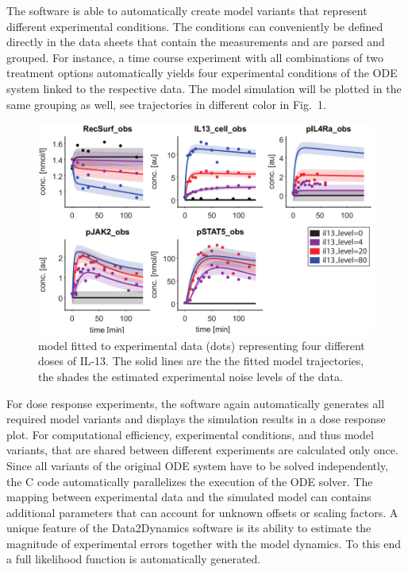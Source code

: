 \documentclass{bioinfo}
\begin{document}
The software is able to automatically create model variants that 
represent different experimental conditions. The conditions can conveniently be defined directly in 
the data sheets that contain the measurements and are parsed and 
grouped. For instance, a time course experiment with all combinations of two treatment 
options automatically yields four experimental conditions of the ODE system linked to the 
respective data. The model simulation will be plotted in the same grouping as well, see 
trajectories in different color in Fig.~1. 
\begin{figure}[!tpb]
\centerline{\includegraphics[width=\linewidth]{Figure_D2D_AppNote_v2a.pdf}}
\caption{\citet{Raia:2011vn} model fitted to experimental data (dots) representing four 
different doses of IL-13. The solid lines are the the fitted model trajectories, the shades 
the estimated experimental noise levels of the data.}\label{fig:01}
\end{figure}
For dose response experiments, the software again automatically generates all required 
model variants and displays the simulation results in a dose response plot. For 
computational efficiency, experimental conditions, and thus model variants, that are 
shared between different experiments are calculated only once. Since all variants of the 
original ODE system have to be solved independently, the C code automatically 
parallelizes the execution of the ODE solver. The mapping between experimental data 
and the simulated model can contains additional parameters that can account for 
unknown offsets or scaling factors. A unique feature of the Data2Dynamics software is its 
ability to estimate the magnitude of experimental errors together with the model 
dynamics. To this end a full likelihood function is automatically generated.
\end{document}
